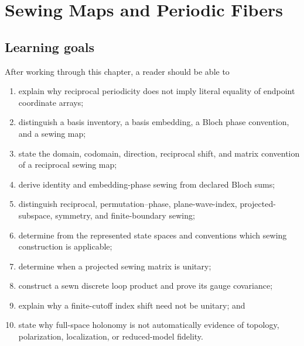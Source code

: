 \chapter{Sewing Maps and Periodic Fibers}

\label{ch:training-sewing-periodic-fibers}


\section{Learning goals}

After working through this chapter, a reader should be able to

\begin{enumerate}
  \item explain why reciprocal periodicity does not imply literal equality of
        endpoint coordinate arrays;
  \item distinguish a basis inventory, a basis embedding, a Bloch phase
        convention, and a sewing map;
  \item state the domain, codomain, direction, reciprocal shift, and matrix
        convention of a reciprocal sewing map;
  \item derive identity and embedding-phase sewing from declared Bloch sums;
  \item distinguish reciprocal, permutation--phase, plane-wave-index,
        projected-subspace, symmetry, and finite-boundary sewing;
  \item determine from the represented state spaces and conventions which
        sewing construction is applicable;
  \item determine when a projected sewing matrix is unitary;
  \item construct a sewn discrete loop product and prove its gauge covariance;
  \item explain why a finite-cutoff index shift need not be unitary; and
  \item state why full-space holonomy is not automatically evidence of
        topology, polarization, localization, or reduced-model fidelity.
\end{enumerate}

